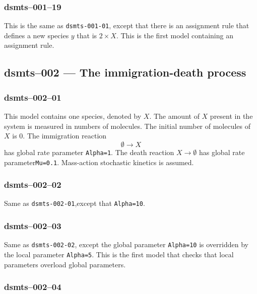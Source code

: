 
\subsubsection{dsmts--001--19}

This is the same as \verb$dsmts-001-01$, except that 
there is an assignment rule that defines a new species $y$ that is
$2\times X$. This is the first model containing an assignment rule.




\subsection{dsmts--002 --- The immigration-death process}

\subsubsection{dsmts--002--01}

This model contains one species, denoted by $X$. The amount of $X$
present in the system is measured in numbers of molecules. The initial
number of molecules of $X$ is $0$. The immigration reaction
\[
\emptyset \longrightarrow X
\] 
has global rate parameter
\texttt{Alpha=1}. The death reaction $X\longrightarrow \emptyset$ has
global rate parameter\texttt{Mu=0.1}. Mass-action stochastic kinetics
is assumed.


\subsubsection{dsmts--002--02} 

Same as \verb$dsmts-002-01$,except that
\verb$Alpha=10$. 


\subsubsection{dsmts--002--03} 

Same as \verb$dsmts-002-02$, except the global parameter
\verb$Alpha=10$ is overridden by the local parameter
\verb$Alpha=5$. This is the first model that checks that local
parameters overload global parameters.


\subsubsection{dsmts--002--04}

